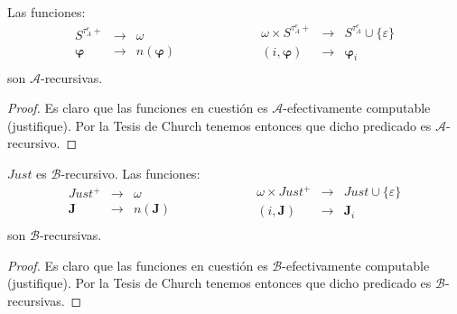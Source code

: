   \begin{lemma} \label{lemma_107}
    \PN Las funciones:
    \begin{equation*}
      \begin{aligned}
        S^{\tau_{A}^{e}+} &\rightarrow& \omega \\
        \pmb{\varphi} &\rightarrow& n(\pmb{\varphi}) \\
      \end{aligned}
      \qquad\qquad\qquad
      \begin{aligned}
        \omega \times S^{\tau_{A}^{e}+} &\rightarrow& S^{\tau_{A}^{e}} \cup \{\varepsilon\} \\
        (i, \pmb{\varphi}) &\rightarrow& \pmb{\varphi}_{i} \\
      \end{aligned}
    \end{equation*}
    \PN son $\mathcal{A}$-recursivas.
  \end{lemma}
  \begin{proof}
    \PN Es claro que las funciones en cuestión es $\mathcal{A}$-efectivamente computable (justifique). Por la Tesis de
    Church tenemos entonces que dicho predicado es $\mathcal{A}$-recursivo.
  \end{proof}

  \begin{lemma} \label{lemma_108}
    \PN $Just$ es $\mathcal{B}$-recursivo. Las funciones:
    \begin{equation*}
      \begin{aligned}
        Just^{+} &\rightarrow& \omega \\
        \mathbf{J} &\rightarrow& n(\mathbf{J}) \\
      \end{aligned}
      \qquad\qquad\qquad
      \begin{aligned}
        \omega \times Just^{+} &\rightarrow& Just \cup \{\varepsilon\} \\
        (i, \mathbf{J}) &\rightarrow& \mathbf{J}_{i} \\
      \end{aligned}
    \end{equation*}
    \PN son $\mathcal{B}$-recursivas.
  \end{lemma}
  \begin{proof}
    \PN Es claro que las funciones en cuestión es $\mathcal{B}$-efectivamente computable (justifique). Por la Tesis de
    Church tenemos entonces que dicho predicado es $\mathcal{B}$-recursivas.
  \end{proof}

